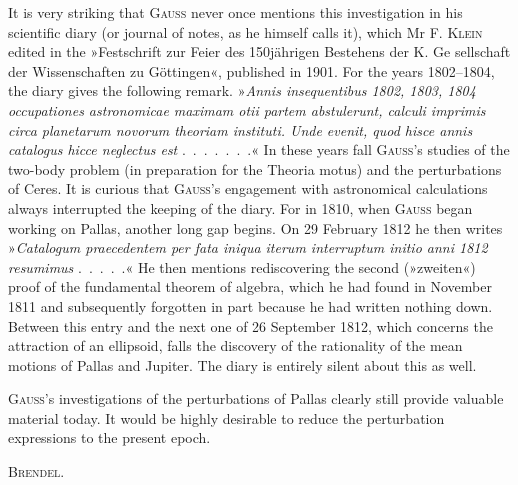 \par\noindent\hspace*{\parindent}It is very striking that \textsc{Gauss} never once mentions this investigation
in his scientific diary (or journal of notes, as he himself calls it), which Mr
F. \textsc{Klein} edited in the »Festschrift zur Feier des 150jährigen Bestehens der K. Ge%
sellschaft der Wissenschaften zu Göttingen«, published in
1901.
For the years 1802--1804, the diary gives the following remark. »\textit{Annis
insequentibus 1802, 1803, 1804 occupationes astronomicae maximam otii partem
abstulerunt, calculi imprimis circa planetarum novorum theoriam instituti.
Unde evenit, quod hisce annis catalogus hicce neglectus est} \mbox{.\ .\ .\ .\ .\ .\ .}«
In these years fall \textsc{Gauss}'s studies of the two-body problem
(in preparation for the Theoria motus) and the perturbations of Ceres. It is curious
that \textsc{Gauss}'s engagement with astronomical calculations
always interrupted the keeping of the diary. For in
1810, when \textsc{Gauss} began working on Pallas,
another long gap begins. On 29 February 1812 he then writes »\textit{Catalogum
praecedentem per fata iniqua iterum interruptum initio anni 1812 resumimus}
\mbox{.\ .\ .\ .\ .}« He then mentions rediscovering the second (»zweiten«) proof
of the fundamental theorem of algebra, which he had found in November 1811
and subsequently forgotten in part because he had written nothing
down. Between this entry and the next one of 26 September
1812, which concerns the attraction of an ellipsoid, falls the
discovery of the rationality of the mean motions of Pallas and Jupiter.
The diary is entirely silent about this as well.

\par\noindent\hspace*{\parindent}\textsc{Gauss}'s investigations of the perturbations of Pallas
clearly still provide valuable material today. It would be highly
desirable to reduce the perturbation expressions to the present
epoch.
\par\nobreak\noindent\hfill\textsc{Brendel}.\par
\nobreak\vspace{3pt}\noindent\makebox[\linewidth]{\rule{.24\linewidth}{.4pt}}\par
\clearpage
\endgroup
